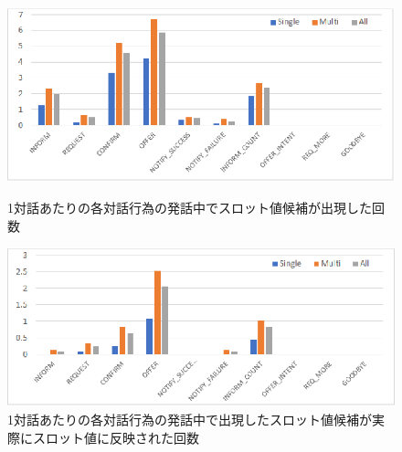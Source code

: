\begin{figure}[thb]
    \begin{center}
        \begin{minipage}{1.0\hsize}
            \begin{center}
            \includegraphics[clip, width=14cm]{chapter5/kouhoslot.eps}
            \caption{1対話あたりの各対話行為の発話中でスロット値候補が出現した回数}
            \label{fig:kouhoslot}
            \hspace{1.6cm}
            \end{center}
        \end{minipage}
        \begin{minipage}{1.0\hsize}
            \begin{center}
            \includegraphics[clip, width=14cm]{chapter5/updateslot.eps}
            \caption{1対話あたりの各対話行為の発話中で出現したスロット値候補が実際にスロット値に反映された回数}
            \label{fig:updateslot}
            \end{center}
        \end{minipage}
    \end{center}
\end{figure}

